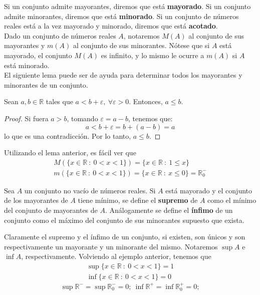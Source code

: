Si un conjunto admite mayorantes, diremos que está \textbf{mayorado}. Si un conjunto admite minorantes, diremos que está \textbf{minorado}. Si un conjunto de números reales está a la vez mayorado y minorado, diremos que está \textbf{acotado}.\\

Dado un conjunto de números reales $A$, notaremos $M(A)$ al conjunto de sus mayorantes y $m(A)$ al conjunto de sus minorantes. Nótese que si $A$ está mayorado, el conjunto $M(A)$ es infinito, y lo mismo le ocurre a $m(A)$ si $A$ está minorado.\\

El siguiente lema puede ser de ayuda para determinar todos los mayorantes y minorantes de un conjunto.
\begin{lema}
    Sean $a,b \in \mathbb{R}$ tales que $a < b+\varepsilon, ~\forall \varepsilon > 0$. Entonces, $a \leq b$.
\end{lema}
\begin{proof}
    Si fuera $a > b$, tomando $\varepsilon = a-b$, tenemos que:
    $$a < b+ \varepsilon = b+(a-b)=a$$ lo que es una contradicción. Por lo tanto, $a \leq b$.
\end{proof}
\begin{ejemplo}
    Utilizando el lema anterior, es fácil ver que
    \begin{gather*}
        M(\{x \in \mathbb{R}~:~ 0 < x < 1\}) = \{x \in \mathbb{R}~:~ 1 \leq x\}\\
        m(\{x \in \mathbb{R}~:~ 0 < x < 1\}) = \{x \in \mathbb{R}~:~ x \leq 0\} = \mathbb{R}_0^{-}
    \end{gather*}
\end{ejemplo}

\begin{definicion}
    Sea $A$ un conjunto no vacío de números reales. Si $A$ está mayorado y el conjunto de los mayorantes de $A$ tiene mínimo, se define el \textbf{supremo} de $A$ como el mínimo del conjunto de mayorantes de $A$. Análogamente se define el \textbf{ínfimo} de un conjunto como el máximo del conjunto de sus minorantes supuesto que exista.
\end{definicion}

Claramente el supremo y el ínfimo de un conjunto, si existen, son únicos y son respectivamente un
mayorante y un minorante del mismo. Notaremos $\sup A$ e $\inf A$, respectivamente. Volviendo al ejemplo anterior,
tenemos que
\begin{gather*}
    \sup \{x \in \mathbb{R}~:~ 0 < x < 1\} = 1\\
    \inf \{x \in \mathbb{R}~:~ 0 < x < 1\} = 0
\end{gather*}
\begin{equation*}
    \sup \mathbb{R}^{-}=\sup \mathbb{R}^{-}_0 = 0;~ \inf \mathbb{R}^{+}=\inf \mathbb{R}^{+}_0 = 0;
\end{equation*}

